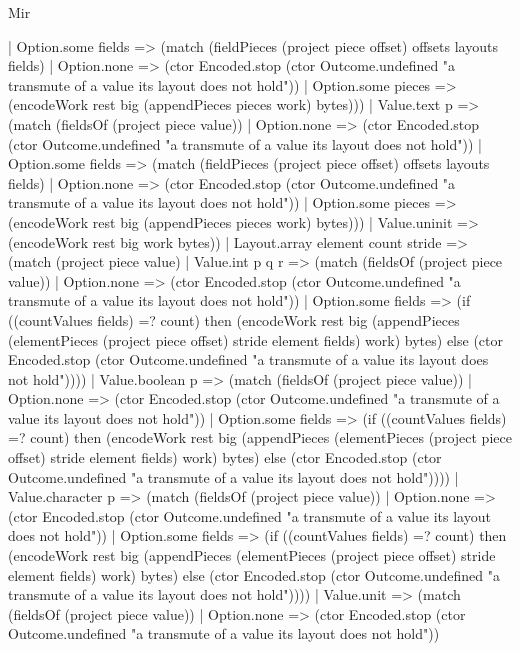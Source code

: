 \begin{lexlean}{Mir}
\begin{semanticmodule}
{            | Option.some fields => (match (fieldPieces (project piece offset) offsets layouts fields)
              | Option.none => (ctor Encoded.stop (ctor Outcome.undefined "a transmute of a value its layout does not hold"))
              | Option.some pieces => (encodeWork rest big (appendPieces pieces work) bytes)))
          | Value.text p => (match (fieldsOf (project piece value))
            | Option.none => (ctor Encoded.stop (ctor Outcome.undefined "a transmute of a value its layout does not hold"))
            | Option.some fields => (match (fieldPieces (project piece offset) offsets layouts fields)
              | Option.none => (ctor Encoded.stop (ctor Outcome.undefined "a transmute of a value its layout does not hold"))
              | Option.some pieces => (encodeWork rest big (appendPieces pieces work) bytes)))
          | Value.uninit => (encodeWork rest big work bytes))
        | Layout.array element count stride => (match (project piece value)
          | Value.int p q r => (match (fieldsOf (project piece value))
            | Option.none => (ctor Encoded.stop (ctor Outcome.undefined "a transmute of a value its layout does not hold"))
            | Option.some fields => (if ((countValues fields) =? count) then (encodeWork rest big (appendPieces (elementPieces (project piece offset) stride element fields) work) bytes) else (ctor Encoded.stop (ctor Outcome.undefined "a transmute of a value its layout does not hold"))))
          | Value.boolean p => (match (fieldsOf (project piece value))
            | Option.none => (ctor Encoded.stop (ctor Outcome.undefined "a transmute of a value its layout does not hold"))
            | Option.some fields => (if ((countValues fields) =? count) then (encodeWork rest big (appendPieces (elementPieces (project piece offset) stride element fields) work) bytes) else (ctor Encoded.stop (ctor Outcome.undefined "a transmute of a value its layout does not hold"))))
          | Value.character p => (match (fieldsOf (project piece value))
            | Option.none => (ctor Encoded.stop (ctor Outcome.undefined "a transmute of a value its layout does not hold"))
            | Option.some fields => (if ((countValues fields) =? count) then (encodeWork rest big (appendPieces (elementPieces (project piece offset) stride element fields) work) bytes) else (ctor Encoded.stop (ctor Outcome.undefined "a transmute of a value its layout does not hold"))))
          | Value.unit => (match (fieldsOf (project piece value))
            | Option.none => (ctor Encoded.stop (ctor Outcome.undefined "a transmute of a value its layout does not hold"))
}
\end{semanticmodule}
\end{lexlean}
